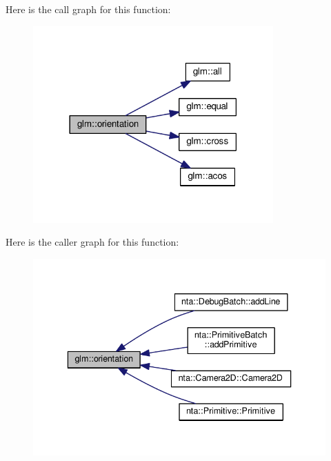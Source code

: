 Here is the call graph for this function\+:
\nopagebreak
\begin{figure}[H]
\begin{center}
\leavevmode
\includegraphics[width=261pt]{df/d02/group__gtx__rotate__vector_ga1a32fceb71962e6160e8af295c91930a_cgraph}
\end{center}
\end{figure}
Here is the caller graph for this function\+:
\nopagebreak
\begin{figure}[H]
\begin{center}
\leavevmode
\includegraphics[width=336pt]{df/d02/group__gtx__rotate__vector_ga1a32fceb71962e6160e8af295c91930a_icgraph}
\end{center}
\end{figure}
\mbox{\label{group__gtx__rotate__vector_gab64a67b52ff4f86c3ba16595a5a25af6}} 
